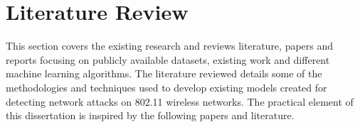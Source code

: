 







\section{Literature Review}                               
\label{sec: Literature Review}

This section covers the existing research and reviews literature, papers and reports focusing on publicly available datasets, existing work and different machine learning algorithms. The literature reviewed details some of the methodologies and techniques used to develop existing models created for detecting network attacks on 802.11 wireless networks. The practical element of this dissertation is inspired by the following papers and literature.

